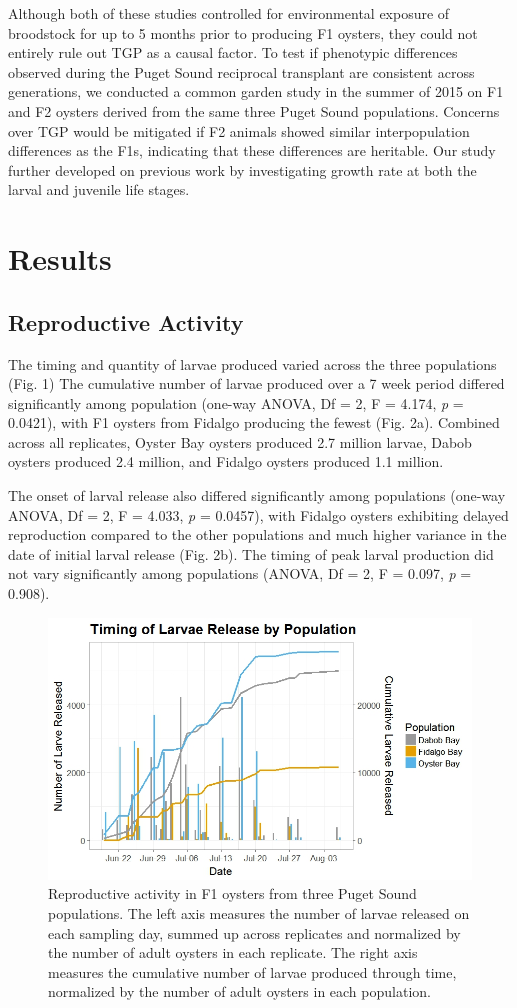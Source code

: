 \documentclass[fleqn,10pt]{wlscirep}
\begin{document}
Although both of these studies controlled for environmental exposure of broodstock for up to 5 months prior to producing F1 oysters, they could not entirely rule out TGP as a causal factor. To test if phenotypic differences observed during the Puget Sound reciprocal transplant are consistent across generations, we conducted a common garden study in the summer of 2015 on F1 and F2 oysters derived from the same three Puget Sound populations. Concerns over TGP would be mitigated if F2 animals showed similar interpopulation differences as the F1s, indicating that these differences are heritable. Our study further developed on previous work by investigating growth rate at both the larval and juvenile life stages. 

\section*{Results}
\subsection*{Reproductive Activity}
The timing and quantity of larvae produced varied across the three populations (Fig. 1) The cumulative number of larvae produced over a 7 week period differed significantly among population (one-way ANOVA, Df = 2, F = 4.174, \textit{p} = 0.0421), with F1 oysters from Fidalgo producing the fewest (Fig. 2a). Combined across all replicates, Oyster Bay oysters produced 2.7 million larvae, Dabob oysters produced 2.4 million, and Fidalgo oysters produced 1.1 million.\par
The onset of larval release also differed significantly among populations (one-way ANOVA, Df = 2, F = 4.033, \textit{p} = 0.0457), with Fidalgo oysters exhibiting delayed reproduction compared to the other populations and much higher variance in the date of initial larval release (Fig. 2b). The timing of peak larval production did not vary significantly among populations (ANOVA, Df = 2, F = 0.097, \textit{p} = 0.908).

\begin{figure}[H]
\centering
\includegraphics[width=0.7\linewidth]{overlay_larvae_timing_PS2015_color_percap.jpeg}
\caption{Reproductive activity in F1 oysters from three Puget Sound populations. The left axis measures the number of larvae released on each sampling day, summed up across replicates and normalized by the number of adult oysters in each replicate. The right axis measures the cumulative number of larvae produced through time, normalized by the number of adult oysters in each population.}
\label{fig:Figure 1}
\end{figure}
\end{document}
